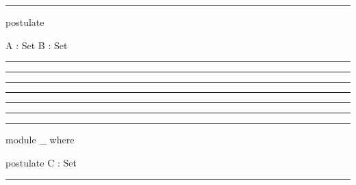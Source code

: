 \documentclass{article}
\begin{document}
\hrule
\begin{code}
postulate
  
  A : Set  
  B : Set  
\end{code}
\hrule
\begin{code}
  
\end{code}
\hrule
\begin{code}

\end{code}
\hrule
\begin{code}
\end{code}
\hrule
\begin{code}  
  \end{code}
\hrule
  \begin{code}  
\end{code}
\hrule
  \begin{code}  
    \end{code}
\hrule
\begin{code}
module _ where
\end{code}
\begin{code}
  
  postulate
    C : Set
\end{code}
\hrule
\end{document}
